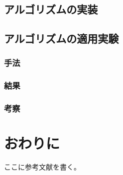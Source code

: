 \documentclass[xelatex,ja=standard,fontsize=10.5pt]{bxjsreport}
\begin{document}
\section{アルゴリズムの実装}

\section{アルゴリズムの適用実験}

\subsection{手法}

\subsection{結果}

\subsection{考察}

%
\chapter{おわりに}

\backmatter

\begin{thebibliography}{}
     ここに参考文献を書く。
\end{thebibliography}
\clearpage
\end{document}
